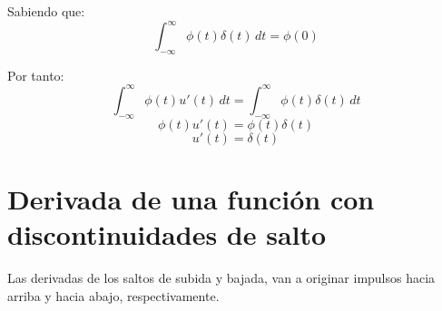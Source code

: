 Sabiendo que:
\begin{equation*}
    \int_{-\infty}^{\infty}\phi(t)\delta(t)\,dt=\phi(0)
\end{equation*}

Por tanto:
\begin{equation*}
    \int_{-\infty}^{\infty}\phi(t)u'(t)\,dt
        =\int_{-\infty}^{\infty}\phi(t)\delta(t)\,dt
\end{equation*}
\begin{equation*}
    \phi(t)u'(t)=\phi(t)\delta(t)
\end{equation*}
\begin{equation*}
    u'(t)=\delta(t)
\end{equation*}

\section{Derivada de una función con discontinuidades de salto}
Las derivadas de los saltos de subida y bajada, van a originar impulsos hacia
arriba y hacia abajo, respectivamente.
\begin{figure}[H]
    \centering
    \begin{minipage}{.4\textwidth}
        \centering
        
    \end{minipage}
    \begin{minipage}{.4\textwidth}
        \centering
        
    \end{minipage}
\end{figure}


